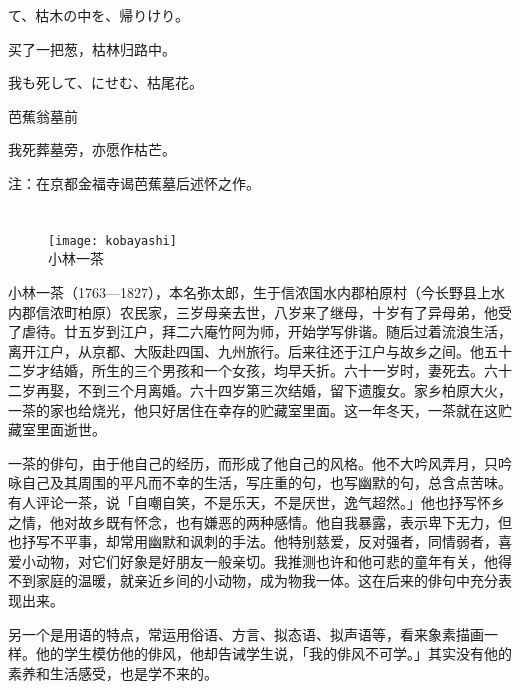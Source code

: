 \begin{haiku}
    {\FH {}て、枯木の中を、帰りけり。}

    {\FK 买了一把葱，枯林归路中。}
\end{haiku}

\begin{haiku}
    {\FH 我も死して、にせむ、枯尾花。}

    {\FK 芭蕉翁墓前}

    {\FK 我死葬墓旁，亦愿作枯芒。}

    {\FT 注：在京都金福寺谒芭蕉墓后述怀之作。}
\end{haiku}

\chapter[{\FM 小林一茶}]{\FM {}}

\begin{center}
    \begin{figure}
        \centering
        \texttt{[image: kobayashi]}\\[1em]
        \large{\FS 小林一茶}
    \end{figure}
\end{center}

\newpage

{\FS
    小林一茶（1763—1827），本名弥太郎，生于信浓国水内郡柏原村（今长野县上水内郡信浓町柏原）农民家，三岁母亲去世，八岁来了继母，十岁有了异母弟，他受了虐待。廿五岁到江户，拜二六庵竹阿为师，开始学写俳谐。随后过着流浪生活，离开江户，从京都、大阪赴四国、九州旅行。后来往还于江户与故乡之间。他五十二岁才结婚，所生的三个男孩和一个女孩，均早夭折。六十一岁时，妻死去。六十二岁再娶，不到三个月离婚。六十四岁第三次结婚，留下遗腹女。家乡柏原大火，一茶的家也给烧光，他只好居住在幸存的贮藏室里面。这一年冬天，一茶就在这贮藏室里面逝世。

    一茶的俳句，由于他自己的经历，而形成了他自己的风格。他不大吟风弄月，只吟咏自己及其周围的平凡而不幸的生活，写庄重的句，也写幽默的句，总含点苦味。有人评论一茶，说「自嘲自笑，不是乐天，不是厌世，逸气超然。」他也抒写怀乡之情，他对故乡既有怀念，也有嫌恶的两种感情。他自我暴露，表示卑下无力，但也抒写不平事，却常用幽默和讽刺的手法。他特别慈爱，反对强者，同情弱者，喜爱小动物，对它们好象是好朋友一般亲切。我推测也许和他可悲的童年有关，他得不到家庭的温暖，就亲近乡间的小动物，成为物我一体。这在后来的俳句中充分表现出来。

    另一个是用语的特点，常运用俗语、方言、拟态语、拟声语等，看来象素描画一样。他的学生模仿他的俳风，他却告诫学生说，「我的俳风不可学。」其实没有他的素养和生活感受，也是学不来的。
}

